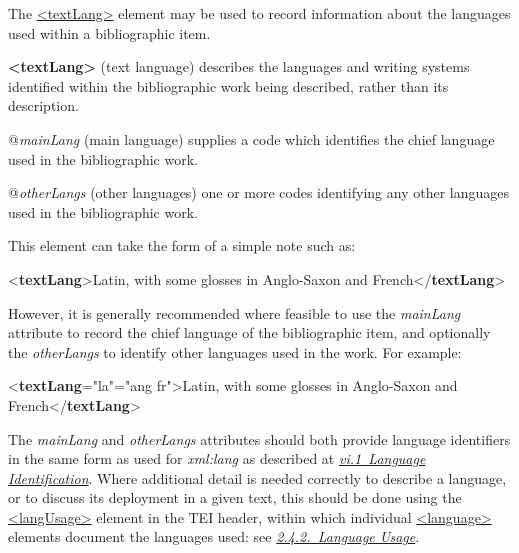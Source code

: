 The \hyperref[TEI.textLang]{<textLang>} element may be used to record information about the languages used within a bibliographic item. 
\begin{sansreflist}
  
\item [\textbf{<textLang>}] (text language) describes the languages and writing systems identified within the bibliographic work being described, rather than its description.\hfil\\[-10pt]\begin{sansreflist}
    \item[@{\itshape mainLang}]
  (main language) supplies a code which identifies the chief language used in the bibliographic work.
    \item[@{\itshape otherLangs}]
  (other languages) one or more codes identifying any other languages used in the bibliographic work.
\end{sansreflist}  
\end{sansreflist}
 This element can take the form of a simple note such as: \par\bgroup{}\exampleFont \begin{shaded}\noindent\mbox{}{<\textbf{textLang}>}Latin, with some glosses in Anglo-Saxon and French{</\textbf{textLang}>}\end{shaded}\egroup\par \noindent  However, it is generally recommended where feasible to use the {\itshape mainLang} attribute to record the chief language of the bibliographic item, and optionally the {\itshape otherLangs} to identify other languages used in the work. For example: \par\bgroup{}\exampleFont \begin{shaded}\noindent\mbox{}{<\textbf{textLang}\hspace*{1em}{mainLang}="{la}"\hspace*{1em}{otherLangs}="{ang fr}">}Latin, with some glosses in Anglo-Saxon and French{</\textbf{textLang}>}\end{shaded}\egroup\par \par
The {\itshape mainLang} and {\itshape otherLangs} attributes should both provide language identifiers in the same form as used for {\itshape xml:lang} as described at \textit{\hyperref[CHSH]{vi.1\ Language Identification}}. Where additional detail is needed correctly to describe a language, or to discuss its deployment in a given text, this should be done using the \hyperref[TEI.langUsage]{<langUsage>} element in the TEI header, within which individual \hyperref[TEI.language]{<language>} elements document the languages used: see \textit{\hyperref[HD41]{2.4.2.\ Language Usage}}.\par
